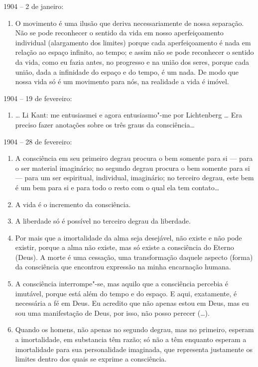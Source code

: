 1904 -- 2 de janeiro:

\begin{enumerate}
\def\labelenumi{\arabic{enumi})}
\setcounter{enumi}{4}
\item
  O movimento é uma ilusão que deriva necessariamente de nossa
  separação. Não se pode reconhecer o sentido da vida em nosso
  aperfeiçoamento individual (alargamento dos limites) porque cada
  aperfeiçoamento é nada em relação ao espaço infinito, ao tempo; e
  assim não se pode reconhecer o sentido da vida, como eu fazia antes,
  no progresso e na união dos seres, porque cada união, dada a
  infinidade do espaço e do tempo, é um nada. De modo que nossa vida só
  é um movimento para nós, na realidade a vida é imóvel.
\end{enumerate}

1904 -- 19 de fevereiro:

\begin{enumerate}
\def\labelenumi{\arabic{enumi})}
\setcounter{enumi}{5}
\item
\ldots{} Li Kant: me entusiasmei e agora entusiasmo"-me por Lichtenberg \ldots{} Era
preciso fazer anotações sobre os três graus da consciência\ldots{}
\end{enumerate}

1904 -- 28 de fevereiro:

\begin{enumerate}
\def\labelenumi{\arabic{enumi})}
\setcounter{enumi}{6}
\item
  A consciência em seu primeiro degrau procura o bem somente para si ---
  para o ser material imaginário; no segundo degrau procura o bem
  somente para si --- para um ser espiritual, individual, imaginário; no
  terceiro degrau, este bem é um bem para si e para todo o resto com o
  qual ela tem contato\ldots{}
\item
  A vida é o incremento da consciência.
\item
  A liberdade só é possível no terceiro degrau da liberdade.
\item
  Por mais que a imortalidade da alma seja desejável, não existe e não
  pode existir, porque a alma não existe, mas só existe a consciência do
  Eterno (Deus). A morte é uma cessação, uma transformação daquele
  aspecto (forma) da consciência que encontrou expressão na minha
  encarnação humana.
\item
  A consciência interrompe"-se, mas aquilo que a consciência percebia é
  imutável, porque está além do tempo e do espaço. E aqui, exatamente, é
  necessária a fé em Deus. Eu acredito que não apenas estou em Deus, mas
  eu sou uma manifestação de Deus, por isso, não posso perecer (\ldots{}).
\item
  Quando os homens, não apenas no segundo degrau, mas no primeiro,
  esperam a imortalidade, em substancia têm razão; só não a têm enquanto
  esperam a imortalidade para sua personalidade imaginada, que
  representa justamente os limites dentro dos quais se exprime a
  consciência.
\end{enumerate}

